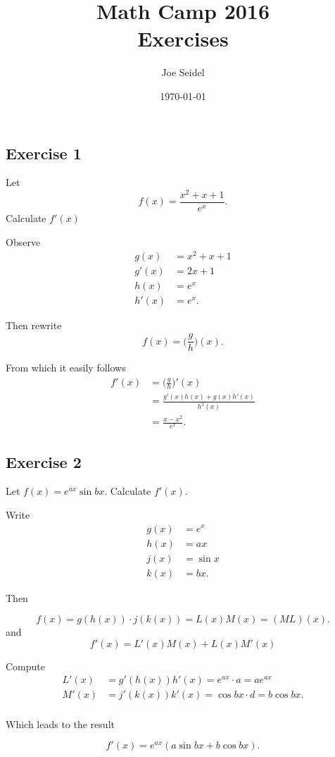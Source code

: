 \documentclass{tufte-book}
\title{Math Camp 2016\\Exercises }
\author{Joe Seidel}
\date{\today}
\theoremstyle{mytheoremstyle}
\theoremstyle{mylemstyle}
\theoremstyle{mydefstyle}
\begin{document}
\maketitle
{}
\newpage
{}

\subsection{Exercise 1}
Let
\[ f(x) = \frac{x^2 + x + 1}{e^x} .\]
Calculate $f'(x)$

Observe
\begin{align*}
g(x) &= x^2 + x + 1\\
g'(x) &= 2x + 1\\
h(x) &= e^x\\
h'(x) &= e^x.
\end{align*}

Then rewrite
\[ f(x) = \big(\frac{g}{h}\big)(x). \]

From which it easily follows
\begin{align*}
f'(x) &= \big(\frac{g}{h}\big)'(x)\\
&= \frac{g'(x)h(x) + g(x)h'(x)}{h^2(x)}\\
&= \frac{x-x^2}{e^x}.
\end{align*}

\subsection{Exercise 2}
Let $f(x) = e^{ax} \sin bx$.  Calculate $f'(x)$.

Write
\begin{align*}
g(x) &= e^x\\
h(x) &= ax\\
j(x) &= \sin x \\
k(x) &= bx.
\end{align*}

Then

\[ f(x) = g(h(x))\cdot j(k(x)) = L(x)M(x) = (ML)(x). \]
and
\[f'(x) = L'(x)M(x) + L(x)M'(x) \]

Compute
\begin{align*}
L'(x) &= g'(h(x))h'(x) = e^{ax} \cdot a = ae^{ax}\\
M'(x) &= j'(k(x))k'(x) = \cos bx \cdot d = b \cos bx. \\
\end{align*}

Which leads to the result

\[ f'(x) = e^{ax}(a \sin bx + b \cos bx). \]
\end{document}

